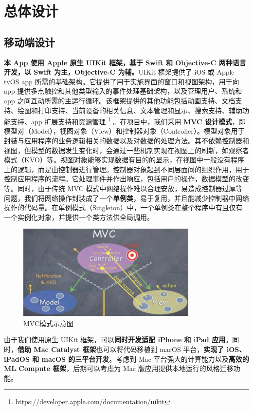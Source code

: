 \section{总体设计}

\subsection{移动端设计}

\textbf{本 App 使用 Apple 原生 UIKit 框架，基于 Swift 和 Objective-C 两种语言开发，以 Swift 为主，Objective-C 为辅。}UIKit 框架提供了 iOS 或 Apple tvOS app 所需的基础架构。它提供了用于实施界面的窗口和视图架构，用于向 app 提供多点触控和其他类型输入的事件处理基础架构，以及管理用户、系统和 app 之间互动所需的主运行循环。该框架提供的其他功能包括动画支持、文档支持、绘图和打印支持、当前设备的相关信息、文本管理和显示、搜索支持、辅助功能支持、app 扩展支持和资源管理 \footnote{https://developer.apple.com/documentation/uikit} 。在项目中，我们采用 \textbf{MVC 设计模式}，即模型对（Model），视图对象（View）和控制器对象（Controller）。模型对象用于封装与应用程序的业务逻辑相关的数据以及对数据的处理方法。其不依赖控制器和视图，但模型的数据发生变化时，会通过一些机制实现在视图上的刷新，如观察者模式（KVO）等。视图对象能够实现数据有目的的显示，在视图中一般没有程序上的逻辑，而是由控制器进行管理。控制器对象起到不同层面间的组织作用，用于控制应用程序的流程。它处理事件并作出响应，包括用户的操作，数据模型的改变等。同时，由于传统 MVC 模式中网络操作难以合理安放，易造成控制器过厚等问题，我们将网络操作封装成了一个\textbf{单例类}，易于复用，并且能减少控制器中网络操作的代码量。在单例模式（Singleton）中，一个单例类在整个程序中有且仅有一个实例化对象，并提供一个类方法供全局调用。

\begin{figure}[H]
    \centering
    \includegraphics[width=0.8\textwidth]{figures/MVC.jpg}
    \caption{MVC模式示意图}
    \label{fig:my_label}
\end{figure}


由于我们使用原生 UIKit 框架，可以\textbf{同时开发适配 iPhone 和 iPad 应用}。同时，\textbf{借助 Mac Catalyst 框架}也可以将代码移植到 macOS 平台，\textbf{实现了 iOS、iPadOS 和 macOS 的三平台开发}。考虑到 Mac 平台强大的计算能力以及\textbf{高效的 ML Compute 框架}，后期可以考虑为 Mac 版应用提供本地运行的风格迁移功能。


